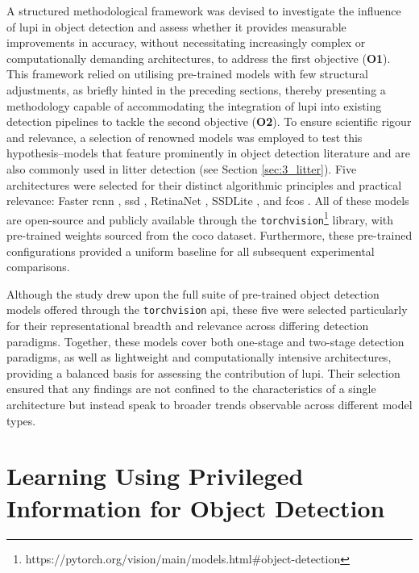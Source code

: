A structured methodological framework was devised to investigate the influence of \gls{lupi} in object detection and assess whether it provides measurable improvements in accuracy, without necessitating increasingly complex or computationally demanding architectures, to address the first objective (\textbf{O1}). This framework relied on utilising pre-trained models with few structural adjustments, as briefly hinted in the preceding sections, thereby presenting a methodology capable of accommodating the integration of \gls{lupi} into existing detection pipelines to tackle the second objective (\textbf{O2}).
To ensure scientific rigour and relevance, a selection of renowned models was employed to test this hypothesis--models that feature prominently in object detection literature and are also commonly used in litter detection (see Section \ref{sec:3_litter}). Five architectures were selected for their distinct algorithmic principles and practical relevance: Faster \gls{rcnn} \cite{rcnn}, \gls{ssd} \cite{ssd}, RetinaNet \cite{retinanet}, SSDLite \cite{ssdlite}, and \gls{fcos} \cite{fcos}. All of these models are open-source and publicly available through the \verb|torchvision|\footnote{https://pytorch.org/vision/main/models.html\#object-detection} library, with pre-trained weights sourced from the \gls{coco} dataset. Furthermore, these pre-trained configurations provided a uniform baseline for all subsequent experimental comparisons.

Although the study drew upon the full suite of pre-trained object detection models offered through the \verb|torchvision| \gls{api}, these five were selected particularly for their representational breadth and relevance across differing detection paradigms. Together, these models cover both one-stage and two-stage detection paradigms, as well as lightweight and computationally intensive architectures, providing a balanced basis for assessing the contribution of \gls{lupi}. Their selection ensured that any findings are not confined to the characteristics of a single architecture but instead speak to broader trends observable across different model types.




\section{Learning Using Privileged Information for Object Detection}
\label{sec:4_lupi4od}


